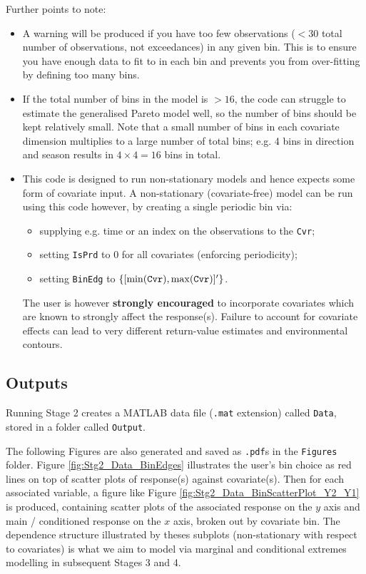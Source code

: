 Further points to note:
\begin{itemize}
\item A warning will be produced if you have too few observations ($<30$ total number of observations, not exceedances) in any given bin. This is to ensure you have enough data to fit to in each bin and prevents you from over-fitting by defining too many bins. 
\item If the total number of bins in the model is $>16$, the code can struggle to estimate the generalised Pareto model well, so the number of bins should be kept relatively small. Note that a small number of bins in each covariate dimension multiplies to a large number of total bins; e.g. 4 bins in direction and season results in $4\times 4 = 16$ bins in total.
\item This code is designed to run non-stationary models and hence expects some form of covariate input. A non-stationary (covariate-free) model can be run using this code however, by creating a single periodic bin via:
	\begin{itemize}
		\item supplying e.g. time or an index on the observations to the \verb|Cvr|;
		\item setting \verb|IsPrd| to 0 for all covariates (enforcing periodicity);
		\item setting \verb|BinEdg| to $\{[\min( \verb|Cvr|),\max(\verb|Cvr|)]'\}$.  
	\end{itemize} 
The user is however \textbf{strongly encouraged} to incorporate covariates which are known to strongly affect the response(s). Failure to account for covariate effects can lead to very different return-value estimates and environmental contours. 
\end{itemize}

\subsection{Outputs}
Running Stage 2 creates a MATLAB data file (\verb|.mat| extension) called \verb|Data|, stored in a folder called \verb|Output|.

The following Figures are also generated and saved as \verb|.pdf|s in the \verb|Figures| folder. Figure \ref{fig:Stg2_Data_BinEdges} illustrates the user's bin choice as red lines on top of scatter plots of response(s) against covariate(s). Then for each associated variable, a figure like Figure \ref{fig:Stg2_Data_BinScatterPlot_Y2_Y1} is produced, containing scatter plots of the associated response on the $y$ axis and main / conditioned response on the $x$ axis, broken out by covariate bin. The dependence structure illustrated by theses subplots (non-stationary with respect to covariates) is what we aim to model via marginal and conditional extremes modelling in subsequent Stages 3 and 4. 


